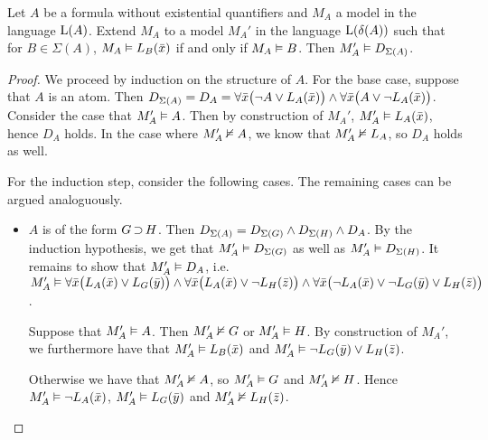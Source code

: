 
\begin{lemma}
	\label{lemma:m_prime}
	Let $A$ be a formula without existential quantifiers and $M_A$ a model in the language $\operatorname{L}(A)$.
	Extend $M_A$ to a model $M_A'$ in the language $\operatorname{L}(\delta(A))$ such that for $B\in\Sigma(A)$, $M_A\vDash L_B(\bar x)$ if and only if $M_A \vDash B$.
	Then $M_A' \vDash D_{\Sigma(A)}$.
\end{lemma}
\begin{proof}
	We proceed by induction on the structure of $A$.
	For the base case, suppose that $A$ is an atom. 
	Then $D_{\Sigma(A)} = D_A  =\allowbreak \forall \bar x \big(\lnot A \lor L_A(\bar x)\big) \land\allowbreak \forall \bar x \big(A \lor \lnot L_A(\bar x)\big)$. 
	Consider the case that $M_A' \vDash A$. Then by construction of $M_A'$, $M_A'\vDash L_A(\bar x)$, hence $D_A$ holds.
	In the case where $M_A' \nvDash A$, we know that $M_A' \nvDash L_A$, so $D_A$ holds as well.

	For the induction step, consider the following cases. The remaining cases can be argued analoguously.
	\begin{itemize}
		\item $A$ is of the form $G \operatorname{\supset} H$. 
			Then $D_{\Sigma(A)} =
			D_{\Sigma(G)} \land
			D_{\Sigma(H)} \land D_A$.
			By the induction hypothesis, we get that $M_A' \vDash D_{\Sigma(G)}$ as well as $M_A' \vDash D_{\Sigma(H)}$.
			It remains to show that $M_A' \vDash D_A$, i.e.~
			$M_A' \vDash \forall \bar x \big(L_A(\bar x) \lor L_G(\bar y)\big) \land
			\forall \bar x \big(L_A(\bar x) \lor \lnot L_H(\bar z)\big) \land \forall \bar x \big(\lnot L_A(\bar x) \lor \lnot L_G(\bar y) \lor L_H(\bar z)\big)  $.

			Suppose that $M_A' \vDash A$.
			Then $M_A' \nvDash G$ or $M_A' \vDash H$. By construction of $M_A'$, we furthermore have that $M_A' \vDash L_B(\bar x)$ and $M_A' \vDash \lnot L_G(\bar y) \lor L_H(\bar z)$.

			Otherwise we have that $M_A' \nvDash A$, so $M_A' \vDash G$ and $M_A' \nvDash H$.
			Hence $M_A' \vDash \lnot  L_A(\bar x)$, $M_A' \vDash L_G(\bar y)$ and $M_A' \nvDash L_H(\bar z)$.


\end{itemize}
\end{proof}

